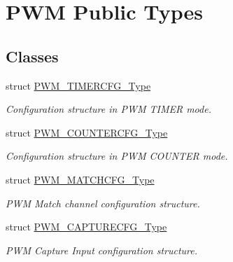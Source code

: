 \hypertarget{group___p_w_m___public___types}{\section{\-P\-W\-M \-Public \-Types}
\label{group___p_w_m___public___types}
}
\subsection*{\-Classes}
\begin{DoxyCompactItemize}
\item 
struct \hyperlink{struct_p_w_m___t_i_m_e_r_c_f_g___type}{\-P\-W\-M\-\_\-\-T\-I\-M\-E\-R\-C\-F\-G\-\_\-\-Type}
\begin{DoxyCompactList}\small\item\em \-Configuration structure in \-P\-W\-M \-T\-I\-M\-E\-R mode. \end{DoxyCompactList}\item 
struct \hyperlink{struct_p_w_m___c_o_u_n_t_e_r_c_f_g___type}{\-P\-W\-M\-\_\-\-C\-O\-U\-N\-T\-E\-R\-C\-F\-G\-\_\-\-Type}
\begin{DoxyCompactList}\small\item\em \-Configuration structure in \-P\-W\-M \-C\-O\-U\-N\-T\-E\-R mode. \end{DoxyCompactList}\item 
struct \hyperlink{struct_p_w_m___m_a_t_c_h_c_f_g___type}{\-P\-W\-M\-\_\-\-M\-A\-T\-C\-H\-C\-F\-G\-\_\-\-Type}
\begin{DoxyCompactList}\small\item\em \-P\-W\-M \-Match channel configuration structure. \end{DoxyCompactList}\item 
struct \hyperlink{struct_p_w_m___c_a_p_t_u_r_e_c_f_g___type}{\-P\-W\-M\-\_\-\-C\-A\-P\-T\-U\-R\-E\-C\-F\-G\-\_\-\-Type}
\begin{DoxyCompactList}\small\item\em \-P\-W\-M \-Capture \-Input configuration structure. \end{DoxyCompactList}\end{DoxyCompactItemize}
